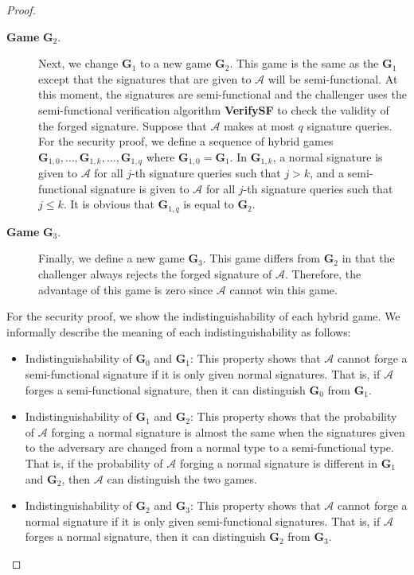 \documentclass[11pt,letterpaper]{article}
\newcommand{\mc}[1]{\mathcal{#1}}
\newcommand{\tb}[1]{\textbf{#1}}
\begin{document}
\begin{proof}
\begin{description}
\item [\textbf{Game} $\tb{G}_2$.] Next, we change $\tb{G}_1$ to a new game
    $\tb{G}_2$. This game is the same as the $\tb{G}_1$ except that the
    signatures that are given to $\mc{A}$ will be semi-functional. At this
    moment, the signatures are semi-functional and the challenger uses the
    semi-functional verification algorithm \textbf{VerifySF} to check the
    validity of the forged signature. Suppose that $\mc{A}$ makes at most
    $q$ signature queries. For the security proof, we define a sequence of
    hybrid games $\tb{G}_{1,0}, \ldots, \tb{G}_{1,k}, \ldots, \tb{G}_{1,q}$
    where $\tb{G}_{1,0} = \tb{G}_1$. In $\tb{G}_{1,k}$, a normal signature
    is given to $\mc{A}$ for all $j$-th signature queries such that $j >
    k$, and a semi-functional signature is given to $\mc{A}$ for all $j$-th
    signature queries such that $j \leq k$. It is obvious that
    $\tb{G}_{1,q}$ is equal to $\tb{G}_2$.

\item [\textbf{Game} $\tb{G}_3$.] Finally, we define a new game $\tb{G}_3$.
    This game differs from $\tb{G}_2$ in that the challenger always rejects
    the forged signature of $\mc{A}$. Therefore, the advantage of this game
    is zero since $\mc{A}$ cannot win this game.
\end{description}

For the security proof, we show the indistinguishability of each hybrid game.
We informally describe the meaning of each indistinguishability as follows:
\begin{itemize}
\item Indistinguishability of $\tb{G}_0$ and $\tb{G}_1$: This property
    shows that $\mc{A}$ cannot forge a semi-functional signature if it is
    only given normal signatures. That is, if $\mc{A}$ forges a
    semi-functional signature, then it can distinguish $\tb{G}_0$ from
    $\tb{G}_1$.

\item Indistinguishability of $\tb{G}_1$ and $\tb{G}_2$: This property
    shows that the probability of $\mc{A}$ forging a normal signature is
    almost the same when the signatures given to the adversary are changed
    from a normal type to a semi-functional type. That is, if the
    probability of $\mc{A}$ forging a normal signature is different in
    $\tb{G}_1$ and $\tb{G}_2$, then $\mc{A}$ can distinguish the two games.

\item Indistinguishability of $\tb{G}_2$ and $\tb{G}_3$: This property
    shows that $\mc{A}$ cannot forge a normal signature if it is only given
    semi-functional signatures. That is, if $\mc{A}$ forges a normal
    signature, then it can distinguish $\tb{G}_2$ from $\tb{G}_3$.
\end{itemize}


\end{proof}
\end{document}
